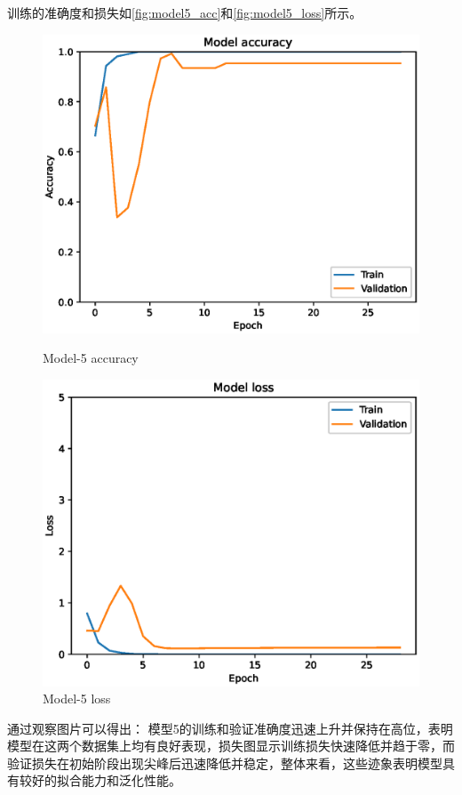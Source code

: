 训练的准确度和损失如\autoref{fig:model5_acc}和\autoref{fig:model5_loss}所示。
\begin{figure}
    \centering
    \begin{minipage}{0.45\textwidth}
        \centering
        \includegraphics[width=\textwidth]{./fig/fish_lung/accuracy5.eps}
        \caption{Model-5 accuracy}
        \label{fig:model5_acc}
    \end{minipage}
    \begin{minipage}{0.45\textwidth}
        \centering
        \includegraphics[width=\textwidth]{./fig/fish_lung/loss5.eps}
        \caption{Model-5 loss}
        \label{fig:model5_loss}
    \end{minipage}
\end{figure}

通过观察图片可以得出：
模型5的训练和验证准确度迅速上升并保持在高位，表明模型在这两个数据集上均有良好表现，损失图显示训练损失快速降低并趋于零，而验证损失在初始阶段出现尖峰后迅速降低并稳定，整体来看，这些迹象表明模型具有较好的拟合能力和泛化性能。



\FloatBarrier